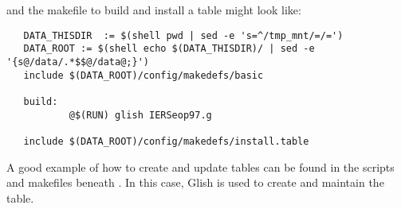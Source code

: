 \noindent
and the makefile to build and install a table might look like:

\begin{verbatim}
   DATA_THISDIR  := $(shell pwd | sed -e 's=^/tmp_mnt/=/=')
   DATA_ROOT := $(shell echo $(DATA_THISDIR)/ | sed -e '{s@/data/.*$$@/data@;}')
   include $(DATA_ROOT)/config/makedefs/basic

   build:
           @$(RUN) glish IERSeop97.g

   include $(DATA_ROOT)/config/makedefs/install.table
\end{verbatim}

\noindent
A good example of how to create and update tables can be found in the
scripts and makefiles beneath . In this
case, Glish is used to create and maintain the  table.
